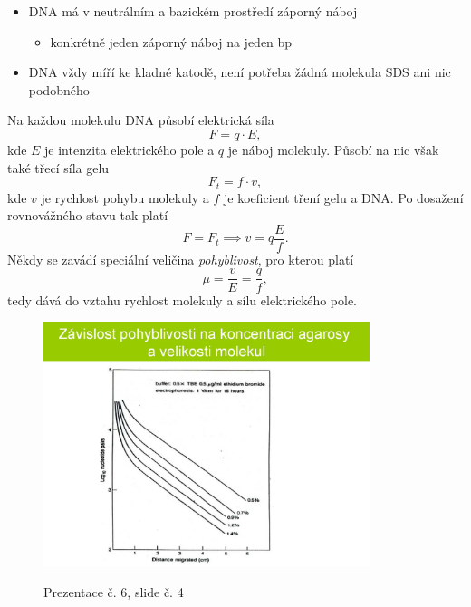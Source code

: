 \documentclass[DIV=8]{scrreprt}
\begin{document}
\begin{itemize}[nosep]
    \item DNA má v neutrálním a bazickém prostředí záporný náboj
\begin{itemize}[nosep]
    \item konkrétně jeden záporný náboj na jeden bp
\end{itemize}

    \item DNA vždy míří ke kladné katodě, není potřeba žádná molekula SDS ani nic podobného
\end{itemize}



Na každou molekulu DNA působí elektrická síla
\[F = q \cdot E,\]
kde \(E\) je intenzita elektrického pole a \(q\) je náboj molekuly. Působí na nic však také třecí síla gelu
\[F_t = f \cdot v,\]
kde \(v\) je rychlost pohybu molekuly a \(f\) je koeficient tření gelu a DNA. Po dosažení rovnovážného stavu tak platí
\[F = F_t \implies v = q \frac{E}{f}.\]
Někdy se zavádí speciální veličina \emph{pohyblivost}, pro kterou platí
\[\mu = \frac{v}{E} = \frac{q}{f},\]
tedy dává do vztahu rychlost molekuly a sílu elektrického pole.

\begin{figure}
    \caption{Prezentace č. 6, slide č. 4}
    \includegraphics[width=0.85\textwidth]{slides-6/slide-4.jpg}
    \centering
    \label{slides-6-slide-4}
\end{figure}
\end{document}
